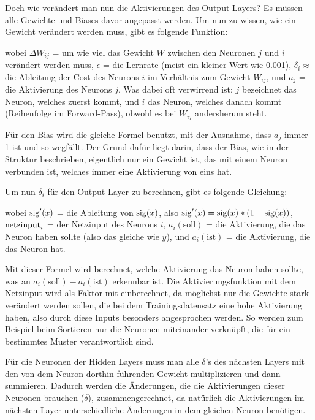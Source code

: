 \documentclass[11pt]{scrartcl}
\begin{document}
	Doch wie verändert man nun die Aktivierungen des Output-Layers? Es müssen alle Gewichte und Biases davor angepasst werden. Um nun zu wissen, wie ein Gewicht verändert werden muss, gibt es folgende Funktion:

	\form{\[
		\Delta W_{ij} = \epsilon * \delta_i * a_j
	\]}

	wobei $\Delta W_{ij}$ = um wie viel das Gewicht $W$ zwischen den Neuronen $j$ und $i$ verändert werden muss, $\epsilon$ = die Lernrate (meist ein kleiner Wert wie 0.001), $\delta_i \approx$ die Ableitung der Cost des Neurons $i$ im Verhältnis zum Gewicht $W_{ij}$, und $a_j$ = die Aktivierung des Neurons $j$. Was dabei oft verwirrend ist: $j$ bezeichnet das Neuron, welches zuerst kommt, und $i$ das Neuron, welches danach kommt (Reihenfolge im Forward-Pass), obwohl es bei $W_{ij}$ andersherum steht.

	Für den Bias wird die gleiche Formel benutzt, mit der Ausnahme, dass $a_j$ immer 1 ist und so wegfällt. Der Grund dafür liegt darin, dass der Bias, wie in der Struktur beschrieben, eigentlich nur ein Gewicht ist, das mit einem Neuron verbunden ist, welches immer eine Aktivierung von eins hat.

	Um nun $\delta_i$ für den Output Layer zu berechnen, gibt es folgende Gleichung: 

	\form{\[
		\delta_i = \sig '\left({\netin}_i\right) * (a_i (\textrm{soll}) - a_i (\textrm{ist})) 
	\]}

	wobei $\textrm{sig} '(x)$ = die Ableitung von $\textrm{sig}(x)$, also $\textrm{sig}'(x) = \textrm{sig}(x) * (1 - \textrm{sig}(x))$, $\textrm{netzinput}_i$ = der Netzinput des Neurons $i$, $a_i(\textrm{soll})$ = die Aktivierung, die das Neuron haben sollte (also das gleiche wie $y$), und $a_i(\textrm{ist})$ = die Aktivierung, die das Neuron hat.

	Mit dieser Formel wird berechnet, welche Aktivierung das Neuron haben sollte, was an $a_i(\textrm{soll}) - a_i(\textrm{ist})$ erkennbar ist. Die Aktivierungsfunktion mit dem Netzinput wird als Faktor mit einberechnet, da möglichst nur die Gewichte stark verändert werden sollen, die bei dem Trainingsdatensatz eine hohe Aktivierung haben, also durch diese Inputs besonders angesprochen werden. So werden zum Beispiel beim Sortieren nur die Neuronen miteinander verknüpft, die für ein bestimmtes Muster verantwortlich sind.
	
	Für die Neuronen der Hidden Layers muss man alle $\delta$'s des nächsten Layers mit den von dem Neuron dorthin führenden Gewicht multiplizieren und dann summieren. Dadurch werden die Änderungen, die die Aktivierungen dieser Neuronen brauchen ($\delta$), zusammengerechnet, da natürlich die Aktivierungen im nächsten Layer unterschiedliche Änderungen in dem gleichen Neuron benötigen.
	
\end{document}
